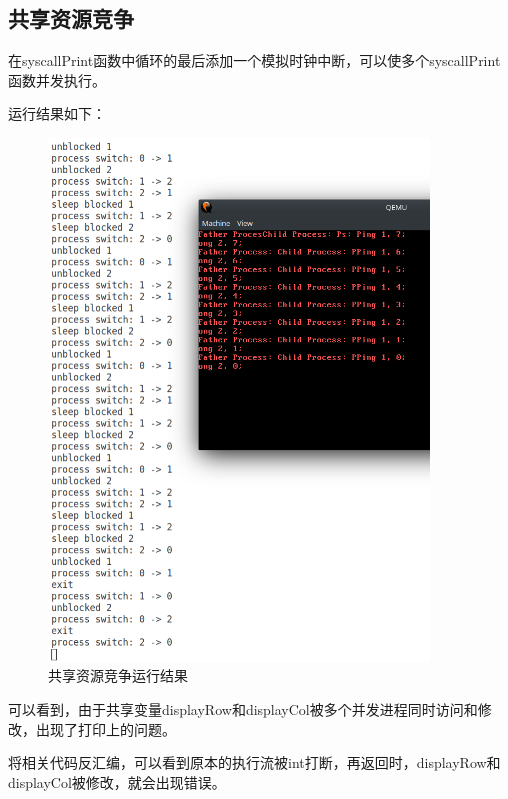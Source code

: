 \documentclass[12pt,a4paper,UTF8]{article}
\begin{document}
\subsection{共享资源竞争}
在syscallPrint函数中循环的最后添加一个模拟时钟中断，可以使多个syscallPrint函数并发执行。

运行结果如下：
\begin{figure}[htbp]
	\centering
	\includegraphics[width=0.9\textwidth]{compete}
	\caption{共享资源竞争运行结果}
\end{figure}
\newpage
可以看到，由于共享变量displayRow和displayCol被多个并发进程同时访问和修改，出现了打印上的问题。
\par 将相关代码反汇编，可以看到原本的执行流被int打断，再返回时，displayRow和displayCol被修改，就会出现错误。

\end{document}
